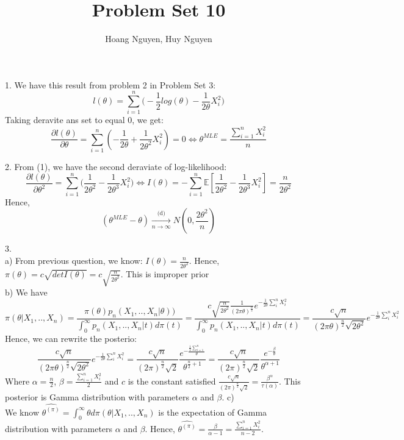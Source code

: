 \documentclass[10pt]{article}
\newenvironment{problem}[2][Problem]{\begin{trivlist}
\item[\hskip \labelsep {\bfseries #1}\hskip \labelsep {\bfseries #2.}]}{\end{trivlist}}
\begin{document}
\title{Problem Set 10}
\author{Hoang Nguyen, Huy Nguyen}
\maketitle
    
\begin{problem}{1}
\item 1.
We have this result from problem 2 in Problem Set 3: 
\[ l(\theta) = \sum_{i=1}^{n} \Big ( -\frac{1}{2} log(\theta) -\frac{1}{2\theta} X_i^2\Big ) \]
Taking deravite ans set to equal 0, we get:
\[\frac{\partial l(\theta)}{\partial\theta} = \sum_{i=1}^{n}(-\frac{1}{2\theta} + \frac{1}{2\theta^2} X_i^2)=0 \Longleftrightarrow \theta^{MLE} = \frac{\sum_{i=1}^{n} X_i^2}{n} \tag{1}\]




\item 2. 
From (1), we have the second deraviate of log-likelihood:
\[\frac{\partial l(\theta)}{\partial \theta^2} =\sum_{i=1}^{n} \Big ( \frac{1}{2\theta^2} - \frac{1}{2\theta^3}X_i^2 \Big ) \Leftrightarrow I(\theta) = -\sum_{i=1}^{n}\mathbb{E}[\frac{1}{2\theta^2} - \frac{1}{2\theta^3}X_i^2]= \frac{n}{2\theta^2}\]
Hence,
\[(\theta^{MLE} - \theta)  \xrightarrow[n \rightarrow \infty]{\text{(d)}} N(0, \frac{2\theta^2}{n})  \]




\item 3.\\ 
a) From previous question, we know: $I(\theta) = \frac{n}{2\theta^2}$. Hence, $\pi(\theta) = c\sqrt{det I(\theta)} = c\sqrt{\frac{n}{2\theta^2}}$. This is improper prior\\
b) We have 
\[ \pi(\theta| X_1,..,X_n) = \frac{\pi(\theta) p_n(X_1,..,X_n|\theta))}{\int_{0}^{\infty} p_n(X_1,..,X_n|t)d\pi(t)} = \frac{c\sqrt{\frac{n}{2\theta^2}} \frac{1}{(2\pi\theta)^{\frac{n}{2}}} e^{-\frac{1}{2\theta} \sum_{i}^{n} X_i^2}}{\int_{0}^{\infty} p_n(X_1,..,X_n|t)d\pi(t)} = \frac{c\sqrt{n}}{(2\pi\theta)^{\frac{n}{2}} \sqrt{2\theta^2}} e^{-\frac{1}{2\theta} \sum_{i}^{n} X_i^2}\]
Hence, we can rewrite the posterio:
\[\frac{c\sqrt{n}}{(2\pi\theta)^{\frac{n}{2}} \sqrt{2\theta^2}} e^{-\frac{1}{2\theta} \sum_{i}^{n} X_i^2} = \frac{c\sqrt{n}}{(2\pi)^{\frac{n}{2}} \sqrt{2}} \frac{e^{-\frac{\frac{1}{2} \sum_{i=1}^{n}}{\theta}}}{\theta^{\frac{n}{2} +1}} = \frac{c\sqrt{n}}{(2\pi)^{\frac{n}{2}} \sqrt{2}} \frac{e^{-\frac{\beta}{\theta}}}{\theta^{\alpha+1}} \]
Where $\alpha = \frac{n}{2}$, $\beta = \frac{\sum_{i=1}^{n} X_i^2}{2}$ and $c$ is the constant satisfied $\frac{c\sqrt{n}}{(2\pi)^{\frac{n}{2}} \sqrt{2}} = \frac{\beta^{\alpha}}{\tau(\alpha)}$. This posterior is Gamma distribution with parameters $\alpha$ and $\beta$.
c)\\
We know $\hat{\theta^{(\pi)}}= \int_{0}^{\infty} \theta d \pi(\theta| X_1,..,X_n)$ is the expectation of Gamma distribution with parameters $\alpha$ and $\beta$. Hence, $\hat{\theta^{(\pi)}} = \frac{\beta}{\alpha - 1} = \frac{\sum_{i=1}^{n} X_i^2}{n -2}$.


\end{problem}
\end{document}
